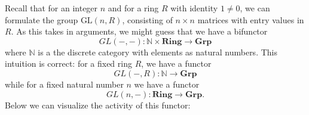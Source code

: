     \begin{example}
        Recall that for an integer $n$ and for a ring $R$ with identity $1 \ne 0$,  
        we can formulate the group $\text{GL}(n, R)$, consisting of $n\times n$ matrices 
        with entry values in $R$. As this takes in arguments, we might guess that we have 
        a bifunctor 
        \[
            GL(-, -): \bm{\mathbb{N}} \times \textbf{Ring} \to \textbf{Grp}
        \]
        where $\bm{\mathbb{N}}$ is a the discrete category with elements as natural numbers. This intuition 
        is correct: for a fixed ring $R$, we have a functor
        \[
            GL(-, R): \bm{\mathbb{N}} \to \textbf{Grp}
        \]
        while for a fixed natural number $n$ we have a functor 
        \[
            GL(n, -): \textbf{Ring} \to \textbf{Grp}.     
        \]
        Below we can visualize the activity of this functor:
        \begin{center}
\end{center}
\end{example}
